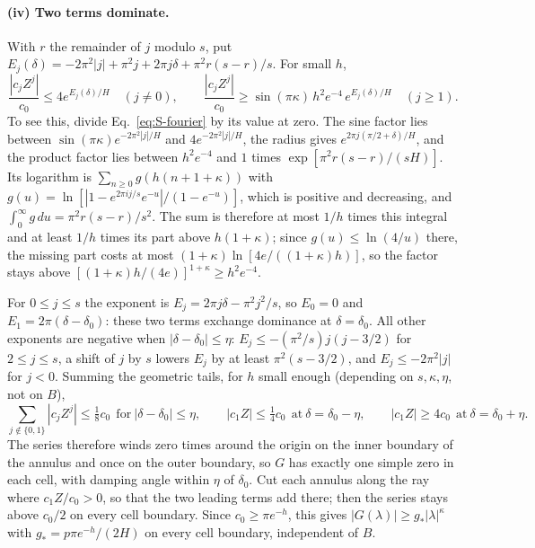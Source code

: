 \paragraph*{(iv) Two terms dominate.} With $r$ the remainder of $j$ modulo $s$, put $E_j(\delta)=-2\pi^2|j|+\pi^2j+2\pi j\delta+\pi^2r(s-r)/s$. For small $h$,
\begin{equation*}
\frac{|c_jZ^j|}{c_0}\le4e^{E_j(\delta)/H}\quad(j\ne0),\qquad\frac{|c_jZ^j|}{c_0}\ge\sin(\pi\kappa)\,h^2e^{-4}\,e^{E_j(\delta)/H}\quad(j\ge1).
\end{equation*}
To see this, divide Eq.~\eqref{eq:S-fourier} by its value at zero. The sine factor lies between $\sin(\pi\kappa)e^{-2\pi^2|j|/H}$ and $4e^{-2\pi^2|j|/H}$, the radius gives $e^{2\pi j(\pi/2+\delta)/H}$, and the product factor lies between $h^2e^{-4}$ and $1$ times $\exp[\pi^2r(s-r)/(sH)]$. Its logarithm is $\sum_{n\ge0}g(h(n+1+\kappa))$ with $g(u)=\ln[|1-e^{2\pi ij/s}e^{-u}|/(1-e^{-u})]$, which is positive and decreasing, and $\int_0^\infty g\,du=\pi^2r(s-r)/s^2$. The sum is therefore at most $1/h$ times this integral and at least $1/h$ times its part above $h(1+\kappa)$; since $g(u)\le\ln(4/u)$ there, the missing part costs at most $(1+\kappa)\ln[4e/((1+\kappa)h)]$, so the factor stays above $[(1+\kappa)h/(4e)]^{1+\kappa}\ge h^2e^{-4}$.

For $0\le j\le s$ the exponent is $E_j=2\pi j\delta-\pi^2j^2/s$, so $E_0=0$ and $E_1=2\pi(\delta-\delta_0)$: these two terms exchange dominance at $\delta=\delta_0$. All other exponents are negative when $|\delta-\delta_0|\le\eta$: $E_j\le-(\pi^2/s)j(j-3/2)$ for $2\le j\le s$, a shift of $j$ by $s$ lowers $E_j$ by at least $\pi^2(s-3/2)$, and $E_j\le-2\pi^2|j|$ for $j<0$. Summing the geometric tails, for $h$ small enough (depending on $s,\kappa,\eta$, not on $B$),
\begin{equation}
\sum_{j\notin\{0,1\}}|c_jZ^j|\le\tfrac18c_0\ \ \text{for}\ |\delta-\delta_0|\le\eta,\qquad|c_1Z|\le\tfrac14c_0\ \ \text{at}\ \delta=\delta_0-\eta,\qquad|c_1Z|\ge4c_0\ \ \text{at}\ \delta=\delta_0+\eta .
\label{eq:S-twoterms}
\end{equation}
The series therefore winds zero times around the origin on the inner boundary of the annulus and once on the outer boundary, so $G$ has exactly one simple zero in each cell, with damping angle within $\eta$ of $\delta_0$. Cut each annulus along the ray where $c_1Z/c_0>0$, so that the two leading terms add there; then the series stays above $c_0/2$ on every cell boundary. Since $c_0\ge\pi e^{-h}$, this gives $|G(\lambda)|\ge g_*|\lambda|^\kappa$ with $g_*=p\pi e^{-h}/(2H)$ on every cell boundary, independent of $B$.

